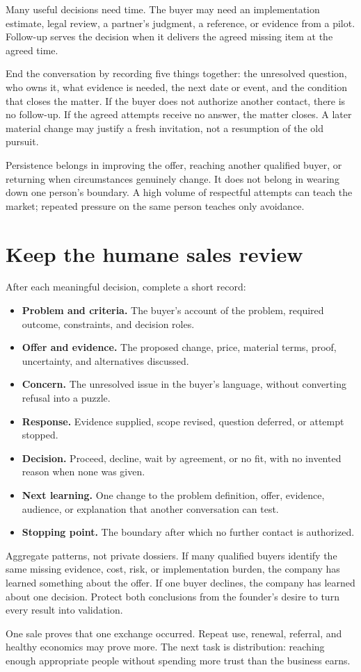 Many useful decisions need time. The buyer may need an implementation estimate,
legal review, a partner's judgment, a reference, or evidence from a pilot.
Follow-up serves the decision when it delivers the agreed missing item at the
agreed time.

End the conversation by recording five things together: the unresolved
question, who owns it, what evidence is needed, the next date or event, and the
condition that closes the matter. If the buyer does not authorize another
contact, there is no follow-up. If the agreed attempts receive no answer, the
matter closes. A later material change may justify a fresh invitation, not a
resumption of the old pursuit.

Persistence belongs in improving the offer, reaching another qualified buyer,
or returning when circumstances genuinely change. It does not belong in
wearing down one person's boundary. A high volume of respectful attempts can
teach the market; repeated pressure on the same person teaches only avoidance.

\section{Keep the humane sales review}

After each meaningful decision, complete a short record:

\begin{itemize}[leftmargin=1.5em,itemsep=0.15em]
\item \textbf{Problem and criteria.} The buyer's account of the problem,
  required outcome, constraints, and decision roles.
\item \textbf{Offer and evidence.} The proposed change, price, material terms,
  proof, uncertainty, and alternatives discussed.
\item \textbf{Concern.} The unresolved issue in the buyer's language, without
  converting refusal into a puzzle.
\item \textbf{Response.} Evidence supplied, scope revised, question deferred,
  or attempt stopped.
\item \textbf{Decision.} Proceed, decline, wait by agreement, or no fit, with no
  invented reason when none was given.
\item \textbf{Next learning.} One change to the problem definition, offer,
  evidence, audience, or explanation that another conversation can test.
\item \textbf{Stopping point.} The boundary after which no further contact is
  authorized.
\end{itemize}

Aggregate patterns, not private dossiers. If many qualified buyers identify
the same missing evidence, cost, risk, or implementation burden, the company
has learned something about the offer. If one buyer declines, the company has
learned about one decision. Protect both conclusions from the founder's desire
to turn every result into validation.

One sale proves that one exchange occurred. Repeat use, renewal, referral, and
healthy economics may prove more. The next task is distribution: reaching
enough appropriate people without spending more trust than the business earns.
